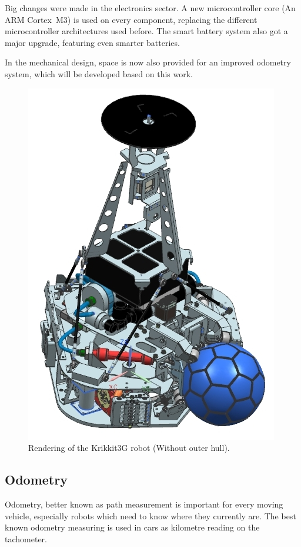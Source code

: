 \documentclass[12pt,a4paper]{article}
\begin{document}
Big changes were made in the electronics sector.
A new microcontroller core (An ARM Cortex~M3) is used on every component, replacing the different microcontroller architectures used before.
The smart battery system also got a major upgrade, featuring even smarter batteries.

In the mechanical design, space is now also provided for an improved odometry system, which will be developed based on this work.


\begin{figure}[b]
\begin{center}  
\includegraphics[width=0.5\columnwidth]{figures/Krikkit3G.jpg}
\caption{\label{fig:krikkit3g}
Rendering of the Krikkit3G robot (Without outer hull).
}   
\end{center}
\end{figure}



\subsection{Odometry}


Odometry, better known as path measurement is important for every moving vehicle, especially robots which need to know where they currently are. 
The best known odometry measuring is used in cars as kilometre reading on the tachometer.
\end{document}
